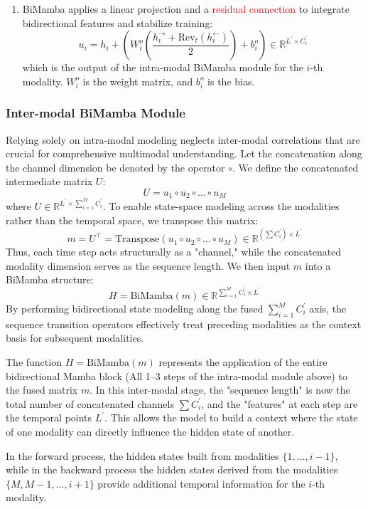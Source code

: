\documentclass[11pt,a4paper]{article}
\newcommand{\R}{\mathbb{R}}
\begin{document}
\begin{enumerate}
		\item BiMamba applies a linear projection and a  \hypertarget{residual}{\textcolor{red}{residual connection}} to integrate bidirectional features and stabilize training:
		$$u_{i}=h_{i}+\left(W_{i}^{o}\left(\frac{h_{i}^{\rightarrow}+\text{Rev}_{t}(h_{i}^{\leftarrow})}{2}\right)+b_{i}^{o}\right)\in\R^{L^{\prime}\times C_{i}^{\prime}}$$
		which is the output of the intra-modal BiMamba module for the $i$-th modality. $W_{i}^{o}$ is the weight matrix, and $b_{i}^{o}$ is the bias.
	\end{enumerate}
	
	\subsubsection{Inter-modal BiMamba Module}
	Relying solely on intra-modal modeling neglects inter-modal correlations that are crucial for comprehensive multimodal understanding. Let the concatenation along the channel dimension be denoted by the operator $\circ$. We define the concatenated intermediate matrix $U$:
	$$U = u_1 \circ u_2 \circ \dots \circ u_M$$
	where $U \in \R^{L^{\prime} \times \sum_{i=1}^{M} C_i^{\prime}}$. To enable state-space modeling across the modalities rather than the temporal space, we transpose this matrix:
	$$m = U^{\top} = \text{Transpose}(u_1 \circ u_2 \circ \dots \circ u_M) \in \R^{(\sum C_i^{\prime}) \times L^{\prime}}$$
	Thus, each time step acts structurally as a "channel," while the concatenated modality dimension serves as the sequence length. We then input $m$ into a BiMamba structure:
	$$ H = \text{BiMamba}(m) \in \R^{\sum_{i=1}^{M} C_i^{\prime} \times L^{\prime}} $$ By performing bidirectional state modeling along the fused $\sum_{i=1}^{M} C_i^{\prime}$ axis, the sequence transition operators effectively treat preceding modalities as the context basis for subsequent modalities.
	
	The function $H = \text{BiMamba}(m)$ represents the application of the entire bidirectional Mamba block (All 1--3 steps of the intra-modal module above) to the fused matrix $m$. In this inter-modal stage, the "sequence length" is now the total number of concatenated channels $\sum C_i^{\prime}$, and the "features" at each step are the temporal points $L^{\prime}$. This allows the model to build a context where the state of one modality can directly influence the hidden state of another.
	
	In the forward process, the hidden states built from modalities $\{1, \dots, i- 1 \}$, while in the backward process the hidden states derived from the modalities $\{M, M - 1, \dots, i + 1\}$ provide additional temporal information for the $i$-th modality.
	
\end{document}
